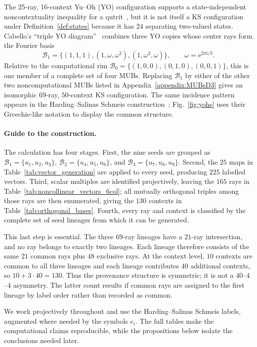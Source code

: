 \documentclass[%
  reprint,
  superscriptaddress,
  showpacs,
  showkeys,
  amsmath,amssymb,
  pra,
  longbibliography,
  floatfix,
  x11names
]{revtex4-2}
\newcommand{\ii}{\mathrm{i}}
\newenvironment{revision}{\begingroup\color{revisionblue}}{\endgroup}
\begin{document}
\begin{revision}
The 25-ray, 16-context Yu--Oh (YO) configuration supports a state-independent noncontextuality inequality for a qutrit~\cite{PhysRevLett.103.050401,Yu-2012,Yu2015}, but it is not itself a KS configuration under Definition~\ref{def:states} because it has $24$ separating two-valued states.  Cabello's ``triple YO diagram''~\cite{Cabello2025} combines three YO copies whose center rays form the Fourier basis
\[
\mathcal{B}_1=\{(1,1,1),(1,\omega,\omega^2),(1,\omega^2,\omega)\},
\qquad \omega=\mathrm{e}^{2\pi\ii{}/3}.
\]
Relative to the computational rim $\mathcal{B}_0=\{(1,0,0),(0,1,0),(0,0,1)\}$, this is one member of a complete set of four MUBs.  Replacing $\mathcal{B}_1$ by either of the other two noncomputational MUBs listed in Appendix~\ref{appendix:MUBsD3} gives an isomorphic $69$-ray, $50$-context KS configuration.  The same incidence pattern appears in the Harding--Salinas Schmeis construction~\cite[Fig.~2 and Theorem~2.6]{harding2025remarksIJTP}; Fig.~\ref{fig:yohs} uses their Greechie-like notation to display the common structure.

\paragraph*{Guide to the construction.}
The calculation has four stages.  First, the nine seeds are grouped as $\mathcal{B}_1=\{u_1,u_2,u_3\}$, $\mathcal{B}_2=\{u_4,u_5,u_6\}$, and $\mathcal{B}_3=\{u_7,u_8,u_9\}$.  
Second, the $25$ maps in Table~\ref{tab:vector_generation} are applied to every seed, producing $225$ labelled vectors.  Third, scalar multiples are identified projectively, leaving the $165$ rays in Table~\ref{tab:noncollinear_vectors_6col}; all mutually orthogonal triples among those rays are then enumerated, giving the $130$ contexts in Table~\ref{tab:orthogonal_bases}.  Fourth, every ray and context is classified by the complete set of seed lineages from which it can be generated.

This last step is essential.  The three $69$-ray lineages have a $21$-ray intersection, and no ray belongs to exactly two lineages.  Each lineage therefore consists of the same $21$ common rays plus $48$ exclusive rays.  At the context level, $10$ contexts are common to all three lineages and each lineage contributes $40$ additional contexts, so $10+3\cdot40=130$.  Thus the provenance structure is symmetric; it is not a $40$--$4$--$4$ asymmetry.  
The latter count results if common rays are assigned to the first lineage by label order rather than recorded as common.

We work projectively throughout and use the Harding--Salinas Schmeis labels, augmented where needed by the symbols $e_i$.  The full tables make the computational claims reproducible, while the propositions below isolate the conclusions needed later.
\end{revision}
\end{document}
